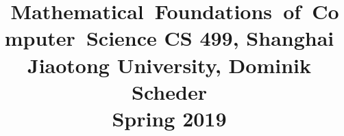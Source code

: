 
\date{}

\title{
\hbox{  Mathematical Foundations of Computer Science}
  \vspace{3mm}
{\normalsize CS 499,	Shanghai Jiaotong University,  Dominik Scheder\\
Spring 2019}
}




\maketitle

%
%
